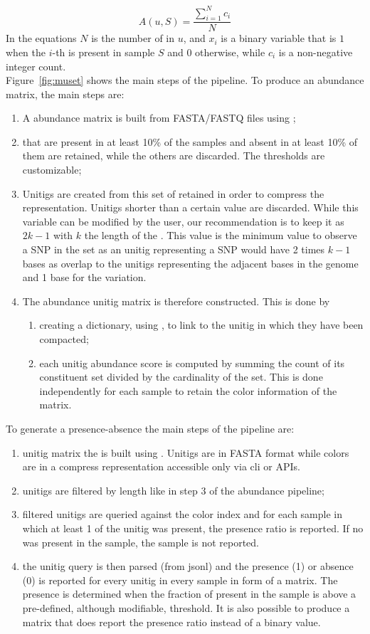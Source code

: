 \begin{equation}
	A(u, S) = \frac{\sum_{i=1}^{N}{c_i}}{N}
\end{equation}
In the equations $N$ is the number of \kmers in $u$, and $x_i$ is a binary variable that is $1$ when the $i$-th \kmer is present in sample $S$ and $0$ otherwise, while $c_i$ is a non-negative integer count.\\
Figure~\ref{fig:muset} shows the main steps of the \muset pipeline. To produce an abundance matrix, the main steps are:
\begin{enumerate}
	\item A \kmer abundance matrix is built from FASTA/FASTQ files using \kmt;
	\item \kmers that are present in at least 10\% of the samples and absent in at least 10\% of them are retained, while the others are discarded. The thresholds are customizable;
	\item Unitigs are created from this set of retained \kmers in order to compress the representation. Unitigs shorter than a certain value are discarded. While this variable can be modified by the user, our recommendation is to keep it as $2k-1$ with $k$ the length of the \kmer. This value is the minimum value to observe a SNP in the set as an unitig representing a SNP would have 2 times $k-1$ bases as overlap to the unitigs representing the adjacent bases in the genome and 1 base for the variation.
	\item The abundance unitig matrix is therefore constructed. This is done by 
	\begin{enumerate}
		\item creating a dictionary, using \ssh, to link \kmers to the unitig in which they have been compacted;
		\item each unitig abundance score is computed by summing the count of its constituent \kmer set divided by the cardinality of the set. This is done independently for each sample to retain the color information of the \kmer matrix.
	\end{enumerate} 
\end{enumerate}
To generate a presence-absence the main steps of the pipeline are:
\begin{enumerate}
	\item unitig matrix the \ccdbg is built using \ggcat. Unitigs are in FASTA format while colors are in a compress representation accessible only via \ggcat cli or APIs.
	\item unitigs are filtered by length like in step 3 of the abundance pipeline;
	\item filtered unitigs are queried against the \ggcat color index and for each sample in which at least 1 \kmer of the unitig was present, the presence ratio is reported. If no \kmer was present in the sample, the sample is not reported.
	\item the unitig query is then parsed (from jsonl) and the presence (1) or absence (0) is reported for every unitig in every sample in form of a matrix. The presence is determined when the fraction of present \kmers in the sample is above a pre-defined, although modifiable, threshold. It is also possible to produce a matrix that does report the presence ratio instead of a binary value.
\end{enumerate}
